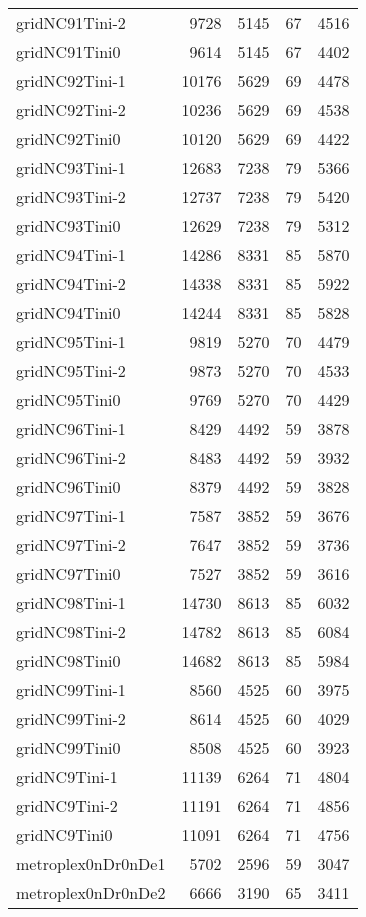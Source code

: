 \begin{longtable}{lrrrr}
gridNC91Tini-2 & 9728 & 5145 & 67 & 4516 \\
gridNC91Tini0 & 9614 & 5145 & 67 & 4402 \\
gridNC92Tini-1 & 10176 & 5629 & 69 & 4478 \\
gridNC92Tini-2 & 10236 & 5629 & 69 & 4538 \\
gridNC92Tini0 & 10120 & 5629 & 69 & 4422 \\
gridNC93Tini-1 & 12683 & 7238 & 79 & 5366 \\
gridNC93Tini-2 & 12737 & 7238 & 79 & 5420 \\
gridNC93Tini0 & 12629 & 7238 & 79 & 5312 \\
gridNC94Tini-1 & 14286 & 8331 & 85 & 5870 \\
gridNC94Tini-2 & 14338 & 8331 & 85 & 5922 \\
gridNC94Tini0 & 14244 & 8331 & 85 & 5828 \\
gridNC95Tini-1 & 9819 & 5270 & 70 & 4479 \\
gridNC95Tini-2 & 9873 & 5270 & 70 & 4533 \\
gridNC95Tini0 & 9769 & 5270 & 70 & 4429 \\
gridNC96Tini-1 & 8429 & 4492 & 59 & 3878 \\
gridNC96Tini-2 & 8483 & 4492 & 59 & 3932 \\
gridNC96Tini0 & 8379 & 4492 & 59 & 3828 \\
gridNC97Tini-1 & 7587 & 3852 & 59 & 3676 \\
gridNC97Tini-2 & 7647 & 3852 & 59 & 3736 \\
gridNC97Tini0 & 7527 & 3852 & 59 & 3616 \\
gridNC98Tini-1 & 14730 & 8613 & 85 & 6032 \\
gridNC98Tini-2 & 14782 & 8613 & 85 & 6084 \\
gridNC98Tini0 & 14682 & 8613 & 85 & 5984 \\
gridNC99Tini-1 & 8560 & 4525 & 60 & 3975 \\
gridNC99Tini-2 & 8614 & 4525 & 60 & 4029 \\
gridNC99Tini0 & 8508 & 4525 & 60 & 3923 \\
gridNC9Tini-1 & 11139 & 6264 & 71 & 4804 \\
gridNC9Tini-2 & 11191 & 6264 & 71 & 4856 \\
gridNC9Tini0 & 11091 & 6264 & 71 & 4756 \\
metroplex0nDr0nDe1 & 5702 & 2596 & 59 & 3047 \\
metroplex0nDr0nDe2 & 6666 & 3190 & 65 & 3411 \\

\end{longtable}
